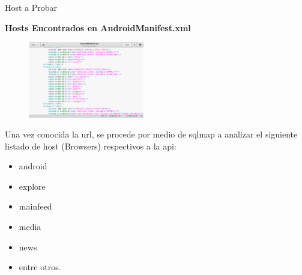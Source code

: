 \begin{frame}[t,fragile]{Host a Probar}

\textbf{Hosts Encontrados en AndroidManifest.xml}

\begin{figure} 
\vspace{2pt}
  \begin{center}
    \includegraphics[width=0.45\textwidth]{xmlhostbrowser.png}
    \label{fig:databaseUserTable}
  \end{center}
  \vspace{2pt}
\end{figure} 

\bigskip

Una vez conocida la url, se procede por medio de sqlmap a analizar el siguiente listado de host (Browsers) respectivos a la api:


\begin{itemize}
\item android
\item explore
\item mainfeed
\item media
\item news
\item entre otros.
\end{itemize}

\end{frame}

